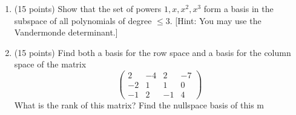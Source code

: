 \documentclass[fleqn]{article}
\begin{document}
\begin{enumerate}
    \item (15 points) Show that the set of powers $1, x, x^2, x^3$ form a basis in the subspace of all polynomials of degree $\leq 3$. 
    [Hint: You may use the Vandermonde determinant.]


    \item (15 points) Find both a basis for the row space and a basis for the column space of the matrix
    $$
      \begin{pmatrix}
        2 & -4 & 2 & -7
        \\
        -2 & 1 & 1 & 0
        \\
        -1 & 2 & -1 & 4
      \end{pmatrix}
    $$
    What is the rank of this matrix? Find the nullspace basis of this m
  \end{enumerate}
\end{document}
